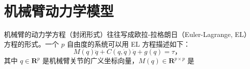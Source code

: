\section{机械臂动力学模型}\label{6Aref}

机械臂的动力学方程（封闭形式）往往写成欧拉-拉格朗日（Euler-Lagrange, EL）方程的形式。一个 $p$ 自由度的系统可以用 EL 方程描述如下：
\begin{equation}
    M(q) \ddot{q} + C(q, \dot{q}) \dot{q} + g(q) = \tau \text{，}
\end{equation}
其中 $q \in \mathbf{R}^p$ 是机械臂关节的广义坐标向量，$M(q) \in \mathbf{R}^{p \times p}$ 是


